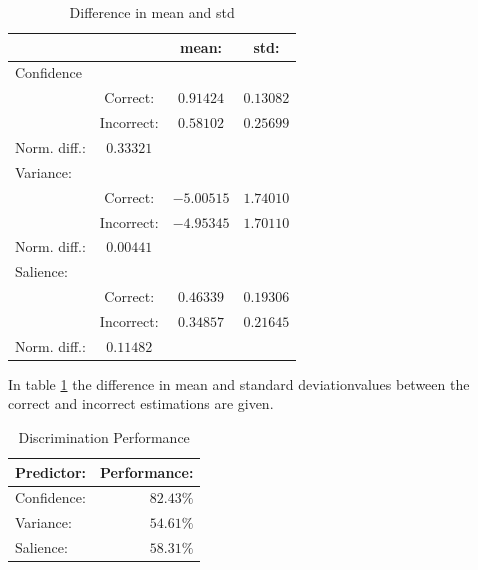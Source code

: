 \documentclass{article}
\begin{document}
\begin{table}[h]
    \begin{center}
        \begin{tabular}{ | l | c | c | c |}
            \hline
                        &           &   mean:       &   std:        \\ \hline
            Confidence  &           &               &               \\  \hline
                        & Correct:  &   $0.91424$   &   $0.13082$   \\  \hline
                        &Incorrect: &   $0.58102$   &   $0.25699$   \\  \hline
            Norm. diff.:    &   $0.33321$   &&\\  \hline
            \hline
            Variance:   &           &               &               \\  \hline
                        & Correct:  &   $-5.00515$  &   $1.74010$   \\  \hline
                        &Incorrect: &   $-4.95345$   &   $1.70110$   \\  \hline
            Norm. diff.:    &   $0.00441$   &&\\  \hline
            \hline
            Salience:   &           &               &               \\  \hline
                        & Correct:  &   $0.46339$   &   $0.19306$   \\  \hline
                        &Incorrect: &   $0.34857$   &   $0.21645$   \\  \hline
            Norm. diff.:    &   $0.11482$   &&\\  \hline
        \end{tabular}
        \caption{Difference in mean and std}
        \label{table:related}
    \end{center}
\end{table}
In table \ref{table:related} the difference in mean and standard deviationvalues between the correct and incorrect estimations are given.
\begin{table}[h]
    \begin{center}
        \begin{tabular}{ | l | r |}
            \hline
            Predictor:  &   Performance:\\  \hline
            \hline
            Confidence: &   $82.43\%$   \\  \hline
            Variance:   &   $54.61\%$   \\  \hline
            Salience:   &   $58.31\%$   \\  \hline
        \end{tabular}
        \caption{Discrimination Performance}
        \label{table:pred_cvs}
    \end{center}
\end{table}
\end{document}
